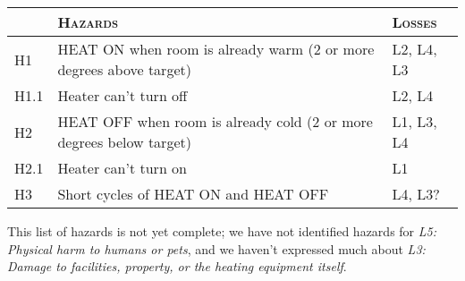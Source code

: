 
\begin{tabular}{|p{.75cm}|p{6.75cm}|p{2cm}|}
\hline
&\textsc{Hazards}&\textsc{Losses}\\
\hline
H1&HEAT ON when room is already warm (2 or more degrees above target)&L2, L4, L3\\
\hline
H1.1&Heater can't turn off&L2, L4\\
\hline
H2&HEAT OFF when room is already cold (2 or more degrees below target)&L1, L3, L4\\
\hline
H2.1&Heater can't turn on&L1\\
\hline
H3&Short cycles of HEAT ON and HEAT OFF&L4, L3?\\
\hline
\end{tabular}
\vspace{1em}

This list of hazards is not yet complete; we have not identified hazards for \emph{L5: Physical harm to humans or pets}, and we haven't expressed much about \emph{L3: Damage to facilities, property, or the heating equipment itself}.




